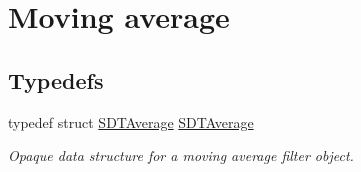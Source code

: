\hypertarget{group__average}{}\section{Moving average}
\label{group__average}
\subsection*{Typedefs}
\begin{DoxyCompactItemize}
\item 
\hypertarget{group__average_ga59d09dcb18c4d483a1577d87ad90d1c3}{}typedef struct \hyperlink{group__average_ga59d09dcb18c4d483a1577d87ad90d1c3}{S\+D\+T\+Average} \hyperlink{group__average_ga59d09dcb18c4d483a1577d87ad90d1c3}{S\+D\+T\+Average}\label{group__average_ga59d09dcb18c4d483a1577d87ad90d1c3}

\begin{DoxyCompactList}\small\item\em Opaque data structure for a moving average filter object. \end{DoxyCompactList}\end{DoxyCompactItemize}
